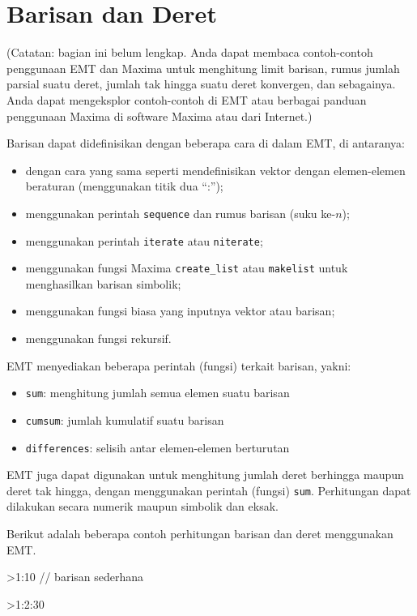 \documentclass[a4paper,11pt,oneside,enabledeprecatedfontcommands]{scrbook}
\newenvironment{eulernotebook}{}{}
\newcommand{\eulerheading}[1]{\chapter{#1}}
\newenvironment{eulercomment}{\par\medskip\noindent}{\par\medskip}
\begin{document}
\begin{eulernotebook}
\eulerheading{Barisan dan Deret}
\begin{eulercomment}
(Catatan: bagian ini belum lengkap. Anda dapat membaca contoh-contoh penggunaan EMT dan Maxima untuk menghitung limit barisan, rumus jumlah parsial suatu deret, jumlah tak hingga suatu deret konvergen, dan sebagainya. Anda dapat mengeksplor contoh-contoh di EMT atau berbagai panduan penggunaan Maxima di software Maxima atau dari Internet.)

Barisan dapat didefinisikan dengan beberapa cara di dalam EMT, di antaranya:
\begin{itemize}
    \item dengan cara yang sama seperti mendefinisikan vektor dengan elemen-elemen beraturan (menggunakan titik dua ``:'');
    \item menggunakan perintah \texttt{sequence} dan rumus barisan (suku ke-$n$);
    \item menggunakan perintah \texttt{iterate} atau \texttt{niterate};
    \item menggunakan fungsi Maxima \texttt{create\_list} atau \texttt{makelist} untuk menghasilkan barisan simbolik;
    \item menggunakan fungsi biasa yang inputnya vektor atau barisan;
    \item menggunakan fungsi rekursif.
\end{itemize}

EMT menyediakan beberapa perintah (fungsi) terkait barisan, yakni:
\begin{itemize}
    \item \texttt{sum}: menghitung jumlah semua elemen suatu barisan
    \item \texttt{cumsum}: jumlah kumulatif suatu barisan
    \item \texttt{differences}: selisih antar elemen-elemen berturutan
\end{itemize}

EMT juga dapat digunakan untuk menghitung jumlah deret berhingga maupun deret tak hingga, dengan menggunakan perintah (fungsi) \texttt{sum}. Perhitungan dapat dilakukan secara numerik maupun simbolik dan eksak.

Berikut adalah beberapa contoh perhitungan barisan dan deret menggunakan EMT.
\end{eulercomment}
\begin{eulerprompt}
>1:10 // barisan sederhana
\end{eulerprompt}
\begin{euleroutput}
  [1,  2,  3,  4,  5,  6,  7,  8,  9,  10]
\end{euleroutput}
\begin{eulerprompt}
>1:2:30
\end{eulerprompt}
\begin{euleroutput}
  [1,  3,  5,  7,  9,  11,  13,  15,  17,  19,  21,  23,  25,  27,  29]
\end{euleroutput}


\end{eulernotebook}
\end{document}
